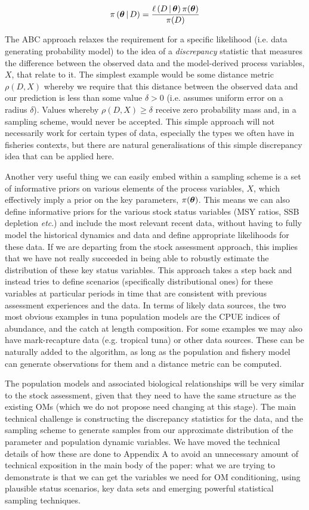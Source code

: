 \documentclass[11pt]{article}
\newcommand{\xtheta}{\mbox{\boldmath$\theta$}}
\begin{document}
\begin{equation*}
  \pi\left(\xtheta\,|\,D\right) = \frac{\ell\left(D\,|\,\xtheta\right)\pi(\xtheta)}{\pi(D)}
\end{equation*}

The ABC approach relaxes the requirement for a specific likelihood (i.e. data generating probability model) to the idea of a \emph{discrepancy} statistic that measures the difference between the observed data and the model-derived process variables, $X$, that relate to it. The simplest example would be some distance metric $\rho(D,X)$ whereby we require that this distance between the observed data and our prediction is less than some value $\delta>0$ (i.e. assumes uniform error on a radius $\delta$). Values whereby $\rho(D,X)\geq\delta$ receive zero probability mass and, in a sampling scheme, would never be accepted. This simple approach will not necessarily work for certain types of data, especially the types we often have in fisheries contexts, but there are natural generalisations of this simple discrepancy idea that can be applied here.

Another very useful thing we can easily embed within a sampling scheme is a set of informative priors on various elements of the process variables, $X$, which effectively imply a prior on the key parameters, $\pi(\xtheta)$. This means we can also define informative priors for the various stock status variables (MSY ratios, SSB depletion \textit{etc}.) and include the most relevant recent data, without having to fully model the historical dynamics and data and define appropriate likelihoods for these data. If we are departing from the stock assessment approach, this implies that we have not really succeeded in being able to robustly estimate the distribution of these key status variables. This approach takes a step back and instead tries to define scenarios (specifically distributional ones) for these variables at particular periods in time that are consistent with previous assessment experiences and the data. In terms of likely data sources, the two most obvious examples in tuna population models are the CPUE indices of abundance, and the catch at length composition. For some examples we may also have mark-recapture data (e.g. tropical tuna) or other data sources. These can be naturally added to the algorithm, as long as the population and fishery model can generate observations for them and a distance metric can be computed.

The population models and associated biological relationships will be very similar to the stock assessment, given that they need to have the same structure as the existing OMs (which we do not propose need changing at this stage). The main technical challenge is constructing the discrepancy statistics for the data, and the sampling scheme to generate samples from our approximate distribution of the parameter and population dynamic variables. We have moved the technical details of how these are done to Appendix A to avoid an unnecessary amount of technical exposition in the main body of the paper: what we are trying to demonstrate is that we can get the variables we need for OM conditioning, using plausible status scenarios, key data sets and emerging powerful statistical sampling techniques.
\end{document}
